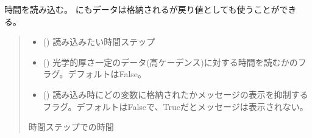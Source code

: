 \documentclass[letterpaper,10pt,dvipdfmx,report]{sphinxmanual}
\begin{document}
\begin{fulllineitems}
\label{\detokenize{io:R2D2.R2D2_data.read_time}}
\pysigstartsignatures
{}
\pysigstopsignatures
\sphinxAtStartPar
時間を読み込む。  にもデータは格納されるが戻り値としても使うことができる。
\begin{quote}\begin{description}
\begin{itemize}
\item {} 
\sphinxAtStartPar
{} () \sphinxhyphen{}\sphinxhyphen{} 読み込みたい時間ステップ

\item {} 
\sphinxAtStartPar
{} () \sphinxhyphen{}\sphinxhyphen{} 光学的厚さ一定のデータ(高ケーデンス)に対する時間を読むかのフラグ。デフォルトはFalse。

\item {} 
\sphinxAtStartPar
{} () \sphinxhyphen{}\sphinxhyphen{} 読み込み時にどの変数に格納されたかメッセージの表示を抑制するフラグ。デフォルトはFalseで、Trueだとメッセージは表示されない。

\end{itemize}

\sphinxAtStartPar
時間ステップでの時間

\end{description}\end{quote}

\end{fulllineitems}

\end{document}
